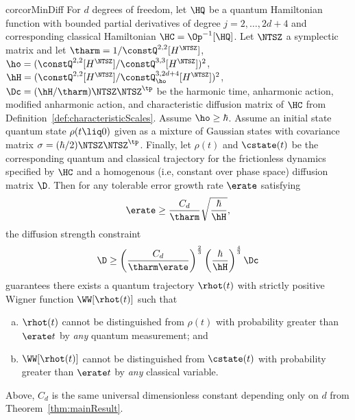 \documentclass{article}
\numberwithin{equation}{section}
\begin{document}
\begin{restatable}{cor}{corMinDiff}
    \label{cor:MinDiff}
    For $d$ degrees of freedom, let $\HQ$ be a quantum Hamiltonian function with bounded partial derivatives of degree $j=2,\ldots,2d+4$ and corresponding classical Hamiltonian $\HC=\Op^{-1}[\HQ]$. Let $\NTSZ$ a symplectic matrix  
    and let 
    $\tharm=1/\constQ^{2,2}[H^\NTSZ]$, 
    $\ho=(\constQ^{2,2}[H^\NTSZ]/\constQ^{3,3}[H^\NTSZ])^{2}$, 
    $\hH=(\constQ^{2,2}[H^\NTSZ]/\constQ^{3,2d+4}_{\ho}[H^\NTSZ])^2$, 
    $\Dc = (\hH/\tharm)\NTSZ\NTSZ^\tp$ 
    be the harmonic time, anharmonic action, modified anharmonic action, and characteristic diffusion matrix of $\HC$ from Definition~\ref{def:characteristicScales}.
    Assume $\ho \ge \hbar$.
    Assume an initial state quantum state $\rho(t\liq 0)$ given as a mixture of Gaussian states with covariance matrix $\sigma = (\hbar/2)\NTSZ\NTSZ^\tp$. 
    Finally,  let $\rho(t)$ and $\cstate(t)$ be the corresponding quantum and classical trajectory for the frictionless dynamics specified by $\HC$ and a homogenous (i.e, constant over phase space) diffusion matrix $\D$.
    Then for any tolerable error growth rate $\erate$ satisfying 
    \begin{equation} \label{eq:erate-thresh}
    \erate \geq  \frac{C_d}{\tharm}\sqrt{\frac{\hbar}{\hH}},
    \end{equation}
    the diffusion strength constraint
    \begin{align}\label{eq:d-threshold}
        \D \ge 
        \left(\frac{C_d}{ \tharm\erate}\right)^{\frac23}
        \left(\frac{\hbar}{\hH}\right)^{\frac43}\Dc
    \end{align} 
    guarantees there exists a quantum trajectory $\rhot(t)$ with strictly positive Wigner function $\WW[\rhot(t)]$ such that
    \begin{enumerate}[a.]
        \item 
        $\rhot(t)$ cannot be distinguished from $\rho(t)$ with probability greater than $\erate t$ by \emph{any} quantum measurement; and
        \item 
        $\WW[\rhot(t)]$ cannot be distinguished from $\cstate(t)$ with probability greater than $\erate t$ by \emph{any} classical variable.
    \end{enumerate}
    Above, $C_d$ is the same universal dimensionless constant depending only on $d$ from Theorem~\ref{thm:mainResult}.
\end{restatable}
\end{document}
